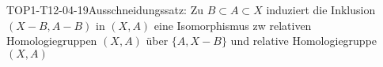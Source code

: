 
\begin{THEO}{TOP1-T12-04-19}{Ausschneidungssatz: Zu $B\subset A\subset X$ induziert die Inklusion $(X-B,A-B)$ in $(X,A)$ eine Isomorphismus zw relativen Homologiegruppen $(X,A)$ über $\{A,X-B\}
$ und relative Homologiegruppe $(X,A)$}
\end{THEO}
